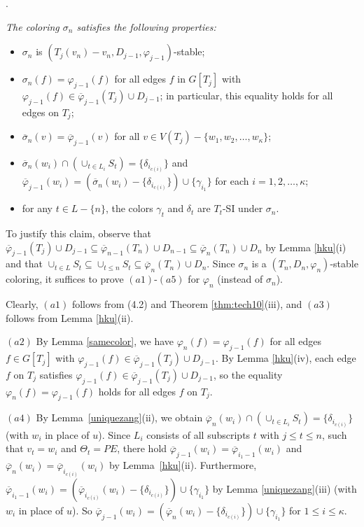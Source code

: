 \documentclass[11pt]{article}
\newcommand{\sigmabar}{\overline{\sigma}}
\newcommand{\phibar}{\overline{\varphi}}
\newcommand{\phiv}{\varphi}
\begin{document}
\vskip 2mm
. {\em The coloring $\sigma_n$ satisfies the following properties: 
\begin{itemize}
\vspace{-2mm}
\item[(a1)] $\sigma_n$ is $(T_j(v_n)-v_n,D_{j-1},\varphi_{j-1})$-stable;
\vspace{-2mm}
\item [(a2)]  $\sigma_n(f) = \phiv_{j-1}(f)$ for all edges $f$ in $G[T_{j}]$ with $\phiv_{j-1}(f) \in \phibar_{j-1}(T_j)
\cup D_{j-1}$; in particular, this equality holds for all edges on $T_j$;  
\vspace{-2mm}
\item [(a3)] $\overline{\sigma}_n(v) = \overline{\phiv}_{j-1}(v)$ for all $v\in V(T_j) - \{w_1, w_2, \ldots, w_{\kappa}\}$; 
\vspace{-2mm} 
\item [(a4)] $\sigmabar_{n}(w_i) \cap (\cup_{t \in L_{i}} S_t) =\{\delta_{i_{c(i)}}\}$ and $\phibar_{j-1}(w_i) 
= (\sigmabar_n(w_i) - \{\delta_{i_{c(i)}} \} )\cup \{\gamma_{i_1}\}$ for each $i=1, 2, \dots, \kappa$; 
\vspace{-2mm} 
\item [(a5)] for any $t\in L-\{n\}$, the colors $\gamma_t$ and $\delta_t$ are $T_t$-SI under $\sigma_n$.
\end{itemize}}

To justify this claim, observe that $\phibar_{j-1}(T_j) \cup D_{j-1}\subseteq \phibar_{n-1}(T_n) \cup D_{n-1}\subseteq  \phibar_{n}(T_n) \cup D_{n}$ 
by Lemma \ref{hku}(i) and that $\cup_{t \in L} S_t \subseteq \cup_{t\le n} S_t \subseteq \phibar_{n}(T_n) \cup D_{n}$. 
Since $\sigma_n$ is a $(T_n, D_n, \varphi_n)$-stable coloring,  it suffices to prove $(a1)$-$(a5)$ for $\phiv_n$ (instead of $\sigma_n$).  

Clearly, $(a1)$ follows from (4.2) and Theorem \ref{thm:tech10}(iii), and $(a3)$ follows from Lemma \ref{hku}(ii). 

$(a2)$ By Lemma \ref{samecolor}, we have $\phiv_n(f) = \phiv_{j-1}(f)$ for all edges $f\in G[T_j]$ with $\phiv_{j-1}(f) \in 
\phibar_{j-1}(T_j)\cup D_{j-1}$. By Lemma \ref{hku}(iv), each edge $f$ on $T_j$ satisfies $\phiv_{j-1}(f) \in \phibar_{j-1}(T_j) 
\cup D_{j-1}$, so the equality $\varphi_n(f) = \phiv_{j-1}(f)$ holds for all edges $f$ on $T_j$.

$(a4)$ By Lemma~\ref{uniquezang}(ii), we obtain $\phibar_{n}(w_i) \cap (\cup_{t \in L_{i}} S_t) =\{\delta_{i_{c(i)}}\}$ (with $w_i$ in place of $u$).
Since $L_i$ consists of all subscripts $t$ with $j\le t \le n$, such that $v_t=w_i$ and $\Theta_t=PE$, there hold $\phibar_{j-1}(w_i)=\phibar_{i_1-1}(w_i)$ 
and  $\phibar_n(w_i)=\phibar_{i_{c(i)}} (w_i)$ by Lemma~\ref{hku}(ii). Furthermore, $\phibar_{i_1-1}(w_i)=(\phibar_{i_{c(i)}}(w_i)-\{\delta_{i_{c(i)}}\}) 
\cup \{\gamma_{i_1}\}$ by Lemma \ref{uniquezang}(iii) (with $w_i$ in place of $u$). So $\phibar_{j-1}(w_i)=(\phibar_n(w_i)-\{\delta_{i_{c(i)}}\}) \cup \{\gamma_{i_1}\}$ for 
$1\le i \le \kappa$.  
\end{document}
